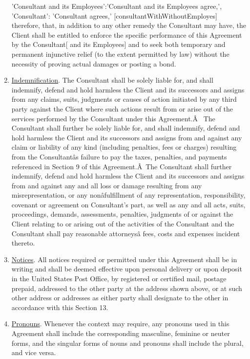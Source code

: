 \documentclass[12pt]{article}
\newcommand{\VAR}[1]{{\color{blue}#1}}
\begin{document}
\begin{enumerate}
    \VAR{
            {
                'Consultant and its Employees':'Consultant and its Employees agree,',
                'Consultant': 'Consultant agrees,'
            }[consultantWithWithoutEmployes]
        }
    therefore, that, in addition to any other remedy the Consultant may have, the Client shall be entitled to enforce the specific performance of this Agreement by the Consultant[ and its Employees] and to seek both temporary and permanent injunctive relief (to the extent permitted by law) without the necessity of proving actual damages or posting a bond.
    \item \underline{Indemnification}. The Consultant shall be solely liable for, and shall indemnify, defend and hold harmless the Client and its successors and assigns from any claims, suits, judgments or causes of action initiated by any third party against the Client where such actions result from or arise out of the services performed by the Consultant under this Agreement.Â  The Consultant shall further be solely liable for, and shall indemnify, defend and hold harmless the Client and its successors and assigns from and against any claim or liability of any kind (including penalties, fees or charges) resulting from the Consultantâs failure to pay the taxes, penalties, and payments referenced in Section 9 of this Agreement.Â The Consultant shall further indemnify, defend and hold harmless the Client and its successors and assigns from and against any and all loss or damage resulting from any misrepresentation, or any nonâfulfillment of any representation, responsibility, covenant or agreement on Consultant's part, as well as any and all acts, suits, proceedings, demands, assessments, penalties, judgments of or against the Client relating to or arising out of the activities of the Consultant and the Consultant shall pay reasonable attorneysâ fees, costs and expenses incident thereto.
    \item \underline{Notices}. All notices required or permitted under this Agreement shall be in writing and shall be deemed effective upon personal delivery or upon deposit in the United States Post Office, by registered or certified mail, postage prepaid, addressed to the other party at the address shown above, or at such other address or addresses as either party shall designate to the other in accordance with this Section 13.
    \item \underline{Pronouns}. Whenever the context may require, any pronouns used in this Agreement shall include the corresponding masculine, feminine or neuter forms, and the singular forms of nouns and pronouns shall include the plural, and vice versa.

\end{enumerate}
\end{document}
